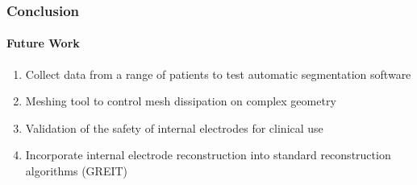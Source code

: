 \documentclass[10pt,    %
    english,            %
    xcolor=table,       %
    envcountsect,        %
    aspectratio=1610
]{beamer}
\begin{document}
\begin{frame}
\frametitle{Conclusion}
\framesubtitle{Future Work}
\begin{enumerate}
	\item Collect data from a range of patients to test automatic segmentation software
	\vspace{3mm}
	\item Meshing tool to control mesh dissipation on complex geometry 
	\vspace{3mm}
	\item Validation of the safety of internal electrodes for clinical use
	\vspace{3mm}
	\item Incorporate internal electrode reconstruction into standard reconstruction algorithms (GREIT)
\end{enumerate}

\end{frame}

\begin{frame}
  \titlepage
\end{frame}

\end{document}

